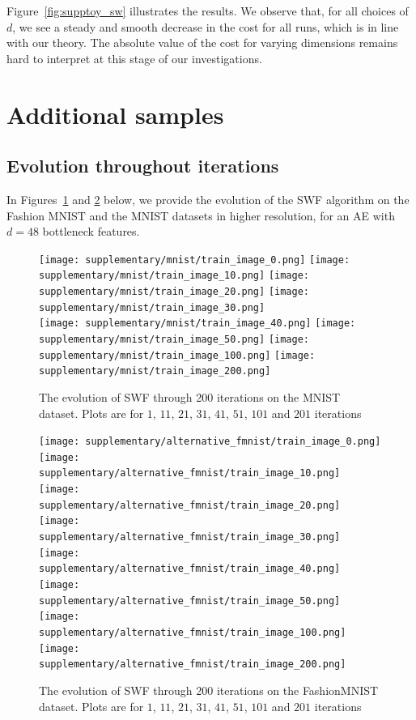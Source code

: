Figure~\ref{fig:supptoy_sw} illustrates the results. We observe that, for all choices of $d$, we see a steady and smooth decrease in the cost for all runs, which is in line with our theory. The absolute value of the cost for varying dimensions remains hard to interpret at this stage of our investigations.

\section{Additional samples}

\subsection{Evolution throughout iterations}

In Figures~\ref{fig:suppmnist} and \ref{fig:suppfmnist} below, we provide the evolution of the SWF algorithm on the Fashion MNIST and the MNIST datasets in higher resolution, for an AE with $d=48$ bottleneck features.

\newcommand{\picwidth}{0.2}%
\begin{figure}
\centering
\texttt{[image: supplementary/mnist/train\_image\_0.png]}
\texttt{[image: supplementary/mnist/train\_image\_10.png]}
\texttt{[image: supplementary/mnist/train\_image\_20.png]}
\texttt{[image: supplementary/mnist/train\_image\_30.png]}\\
\texttt{[image: supplementary/mnist/train\_image\_40.png]}
\texttt{[image: supplementary/mnist/train\_image\_50.png]}
\texttt{[image: supplementary/mnist/train\_image\_100.png]}
\texttt{[image: supplementary/mnist/train\_image\_200.png]}
\caption{The evolution of SWF through 200 iterations on the MNIST dataset. Plots are for $1$, $11$, $21$, $31$, $41$, $51$, $101$ and $201$ iterations}
\label{fig:suppmnist}
\end{figure}

\begin{figure}
\centering
\texttt{[image: supplementary/alternative\_fmnist/train\_image\_0.png]}
\texttt{[image: supplementary/alternative\_fmnist/train\_image\_10.png]}
\texttt{[image: supplementary/alternative\_fmnist/train\_image\_20.png]}
\texttt{[image: supplementary/alternative\_fmnist/train\_image\_30.png]}\\
\texttt{[image: supplementary/alternative\_fmnist/train\_image\_40.png]}
\texttt{[image: supplementary/alternative\_fmnist/train\_image\_50.png]}
\texttt{[image: supplementary/alternative\_fmnist/train\_image\_100.png]}
\texttt{[image: supplementary/alternative\_fmnist/train\_image\_200.png]}
\caption{The evolution of SWF through 200 iterations on the FashionMNIST dataset. Plots are for $1$, $11$, $21$, $31$, $41$, $51$, $101$ and $201$ iterations}
\label{fig:suppfmnist}
\end{figure}

